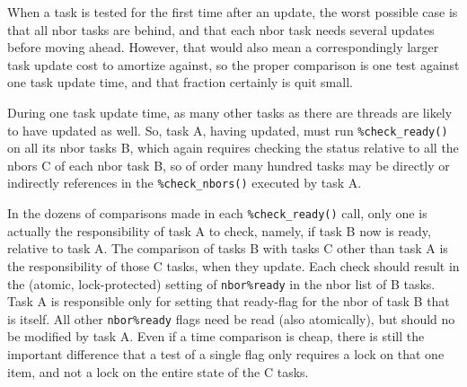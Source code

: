 \documentclass[paper=a4,fontsize=11pt]{scrartcl}
\numberwithin{equation}{section}		%
\numberwithin{figure}{section}			%
\numberwithin{table}{section}				%
\begin{document}
When a task is tested for the first time after an update, the worst possible case is that all nbor tasks are behind, and that each nbor task needs several updates before moving ahead.   However, that would also mean a correspondingly larger task update cost to amortize against, so the proper comparison is one test against one task update time, and that fraction certainly is quit small.  

During one task update time, as many other tasks as there are threads are likely to have updated as well.  So, task A, having updated, must run \verb|%check_ready()| on all its nbor tasks B, which again requires checking the status relative to all the nbors C of each nbor task B, so of order many hundred tasks may be directly or indirectly references in the \verb|%check_nbors()| executed by task A.

In the dozens of comparisons made in each \verb|%check_ready()| call, only one is actually the responsibility of task A to check, namely, if task B now is ready, relative to task A.  The comparison of tasks B with tasks C other than task A is the responsibility of those C tasks, when they update.  Each check should result in the (atomic, lock-protected) setting of \verb|nbor%ready| in the nbor list of B tasks.  Task A is responsible only for setting that ready-flag for the nbor of task B that is itself.  All other \verb|nbor%ready| flags need be read (also atomically), but should no be modified by task A.  Even if a time comparison is cheap, there is still the important difference that a test of a single flag only requires a lock on that one item, and not a lock on the entire state of the C tasks.
\end{document}
